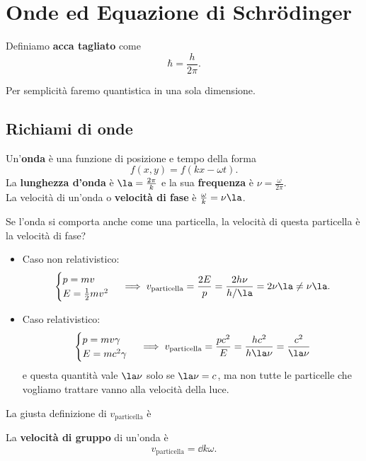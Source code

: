 \chapter{Onde ed Equazione di Schr\"odinger}

\begin{definition}
Definiamo \textbf{acca tagliato} come
\[\hbar=\frac h{2\pi}.\]
\end{definition}

\noindent
Per semplicit\`a faremo quantistica in una sola dimensione.

\section{Richiami di onde}
\begin{definition}[Onda]
Un'\textbf{onda} \`e una funzione di posizione e tempo della forma
\[f(x,y)=f(kx-\omega t).\]
La \textbf{lunghezza d'onda} \`e $\la=\frac{2\pi}k$ e la sua \textbf{frequenza} \`e $\nu=\frac\omega{2\pi}$.\\
La velocit\`a di un'onda o \textbf{velocit\`a di fase} \`e $\frac{\omega}k=\nu\la$.
\end{definition}

\noindent
Se l'onda si comporta anche come una particella, la velocit\`a di questa particella \`e la velocit\`a di fase?
\begin{itemize}
\item Caso non relativistico:
\[\begin{cases}
p=mv\\
E=\frac12mv^2
\end{cases}\implies v_{\text{particella}}=\frac{2E}p=\frac{2h\nu}{h/\la}=2\nu\la\neq \nu\la.\]
\item Caso relativistico:
\[\begin{cases}
p=mv\gamma\\
E=mc^2\gamma
\end{cases}\implies v_{\text{particella}}=\frac{pc^2}E=\frac{hc^2}{h\la\nu}=\frac{c^2}{\la\nu}\]
e questa quantit\`a vale $\la\nu$ solo se $\la\nu=c$, ma non tutte le particelle che vogliamo trattare vanno alla velocit\`a della luce.
\end{itemize}
\noindent La giusta definizione di $v_{\text{particella}}$ \`e

\begin{definition}
La \textbf{velocit\`a di gruppo} di un'onda \`e
\[v_{\text{particella}}=\dd k\omega.\]
\end{definition}

